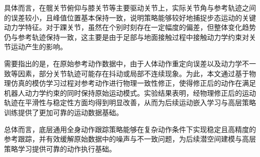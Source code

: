 具体而言，在髋关节俯仰与膝关节等主要驱动关节上，实际关节角与参考轨迹之间的误差较小，且峰值位置基本保持一致，说明策略能够较好地捕捉步态运动的关键动力学特征。对于踝关节，虽然在个别时刻存在一定幅度的偏差，但整体变化趋势仍与参考轨迹保持一致，这主要是由于足部与地面接触过程中接触动力学约束对关节运动产生的影响。

需要指出的是，在原始参考动作数据中，由于人体动作重定向误差以及动力学不一致等因素，部分关节轨迹可能存在抖动或局部不连续现象。为此，本文通过基于物理仿真的模仿学习过程对参考动作进行物理一致性修正，使得修正后的动作在满足机器人动力学约束的同时保持原始运动模式。实验结果表明，经物理修正后的运动轨迹在平滑性与稳定性方面均得到明显改善，从而为后续运动嵌入学习与高层策略训练提供了更加可靠的运动数据基础。

总体而言，底层通用全身动作跟踪策略能够在复杂动作条件下实现稳定且高精度的参考跟踪，并有效缓解原始数据中的噪声与不一致问题，为后续潜空间建模与高层策略学习提供可靠的动作执行基础。

